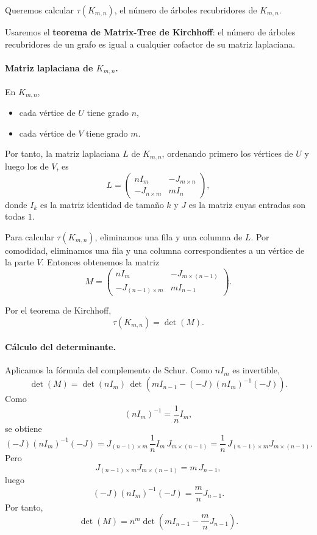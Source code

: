 \documentclass[12pt]{article}
\begin{document}
Queremos calcular \(\tau(K_{m,n})\), el número de árboles recubridores de \(K_{m,n}\).

\medskip

Usaremos el \textbf{teorema de Matrix-Tree de Kirchhoff}: el número de árboles recubridores de un grafo es igual a cualquier cofactor de su matriz laplaciana.

\paragraph{Matriz laplaciana de \(K_{m,n}\).}
En \(K_{m,n}\),
\begin{itemize}
    \item cada vértice de \(U\) tiene grado \(n\),
    \item cada vértice de \(V\) tiene grado \(m\).
\end{itemize}
Por tanto, la matriz laplaciana \(L\) de \(K_{m,n}\), ordenando primero los vértices de \(U\) y luego los de \(V\), es
\[
L=
\begin{pmatrix}
nI_m & -J_{m\times n}\\[1mm]
-J_{n\times m} & mI_n
\end{pmatrix},
\]
donde \(I_k\) es la matriz identidad de tamaño \(k\) y \(J\) es la matriz cuyas entradas son todas \(1\).

Para calcular \(\tau(K_{m,n})\), eliminamos una fila y una columna de \(L\). Por comodidad, eliminamos una fila y una columna correspondientes a un vértice de la parte \(V\). Entonces obtenemos la matriz
\[
M=
\begin{pmatrix}
nI_m & -J_{m\times (n-1)}\\[1mm]
-J_{(n-1)\times m} & mI_{n-1}
\end{pmatrix}.
\]

Por el teorema de Kirchhoff,
\[
\tau(K_{m,n})=\det(M).
\]

\paragraph{Cálculo del determinante.}
Aplicamos la fórmula del complemento de Schur. Como \(nI_m\) es invertible,
\[
\det(M)=\det(nI_m)\,
\det\!\left(mI_{n-1}-(-J)(nI_m)^{-1}(-J)\right).
\]
Como
\[
(nI_m)^{-1}=\frac1n I_m,
\]
se obtiene
\[
(-J)(nI_m)^{-1}(-J)
=
J_{(n-1)\times m}\,\frac1n I_m\,J_{m\times(n-1)}
=
\frac1n\,J_{(n-1)\times m}J_{m\times(n-1)}.
\]
Pero
\[
J_{(n-1)\times m}J_{m\times(n-1)}=m\,J_{n-1},
\]
luego
\[
(-J)(nI_m)^{-1}(-J)=\frac{m}{n}J_{n-1}.
\]
Por tanto,
\[
\det(M)=n^m\det\!\left(mI_{n-1}-\frac{m}{n}J_{n-1}\right).
\]
\end{document}
